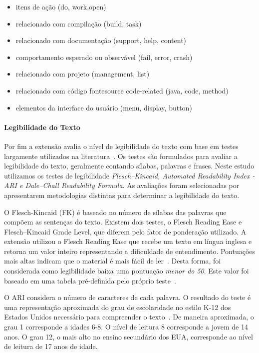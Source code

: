 \begin{itemize}

    \item itens de ação (do, work,open)
    \item relacionado com compilação (build, task)
    \item relacionado com documentação (support, help, content)
    \item comportamento esperado ou observável (fail, error, crash)
    \item relacionado com projeto (management, list)
    \item relacionado com código fontesource code-related (java, code, method)
    \item elementos da interface do usuário (menu, display, button)

\end{itemize}

\paragraph{Legibilidade do Texto}
\label{par:legibilidade_do_texto}

Por fim a extensão avalia o nível de legibilidade do texto com base em testes
largamente utilizados na literatura~\cite{Si:2001:SMS:502585.502695}. Os testes
são formulados para avaliar a legibilidade do texto, geralmente contando
sílabas, palavras e frases. Neste estudo utilizamos os testes de legibilidade
\textit{Flesch–Kincaid, Automated Readability Index \@-\@ ARI e Dale–Chall
    Readability Formula}. As avaliações foram selecionadas por apresentarem
metodologias distintas para determinar a legibilidade do texto.

O Flesch-Kincaid (FK) é baseado no número de sílabas das palavras que compõem as
sentenças do texto. Existem dois testes, o Flesch Reading Ease e Flesch–Kincaid
Grade Level, que diferem pelo fator de ponderação utilizado. A extensão utilizou
o Flesch Reading Ease que recebe um texto em língua inglesa e retorna um valor
inteiro representando a dificuldade de entendimento. Pontuações mais altas
indicam que o material é mais fácil de ler~\cite{kincaid1975derivation}. Desta
forma, foi considerada como legibilidade baixa uma pontuação \textit{menor do
    50}. Este valor foi baseado em uma tabela pré-definida pelo próprio
teste~\cite{kincaid1975derivation}.

O ARI considera o número de caracteres de cada palavra. O resultado do teste é
uma representação aproximada do grau de escolaridade no estilo K-12 dos Estados
Unidos necessário para compreender o texto~\cite{senter1967automated}. De
maneira aproximada, o grau 1 corresponde a idades 6\@-\@8. O nível de leitura 8
corresponde a jovem de 14 anos. O grau 12, o mais alto no ensino secundário dos
EUA, corresponde ao nível de leitura de 17 anos de idade.

